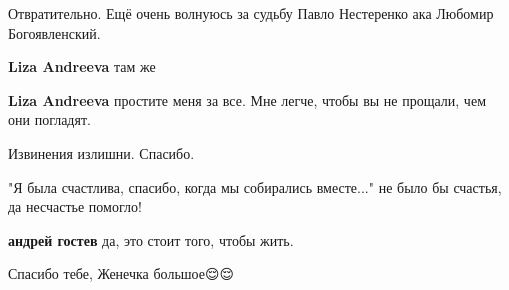 \begin{itemize}
\begin{itemize}
Отвратительно. Ещё очень волнуюсь за судьбу Павло Нестеренко ака Любомир Богоявленский.

 
\textbf{Liza Andreeva} там же

 
\textbf{Liza Andreeva} простите меня за все. Мне легче, чтобы вы не прощали, чем они погладят.

 
Извинения излишни. Спасибо.
\end{itemize}

 

"Я была счастлива, спасибо, когда мы собирались вместе..." не было бы счастья,
да несчастье помогло!\Laughey[1.0][white]

\begin{itemize}
 
\textbf{андрей гостев} да, это стоит того, чтобы жить.
\end{itemize}

 
Спасибо тебе, Женечка большое😌😌💛💛

\begin{itemize}
 

\end{itemize}
\end{itemize}
